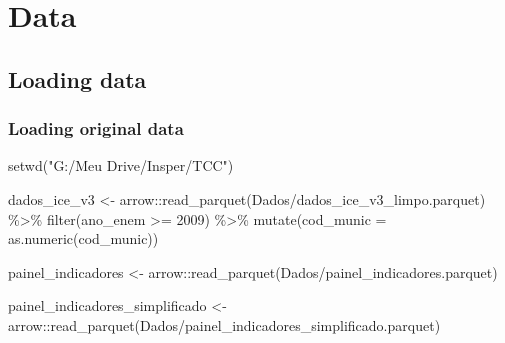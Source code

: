 \documentclass[
  letterpaper,
  DIV=11,
  numbers=noendperiod]{scrartcl}
\newenvironment{Shaded}{\begin{snugshade}}{\end{snugshade}}
\newcommand{\AttributeTok}[1]{\textcolor[rgb]{0.40,0.45,0.13}{#1}}
\newcommand{\DecValTok}[1]{\textcolor[rgb]{0.68,0.00,0.00}{#1}}
\newcommand{\FunctionTok}[1]{\textcolor[rgb]{0.28,0.35,0.67}{#1}}
\newcommand{\NormalTok}[1]{\textcolor[rgb]{0.00,0.23,0.31}{#1}}
\newcommand{\OtherTok}[1]{\textcolor[rgb]{0.00,0.23,0.31}{#1}}
\newcommand{\SpecialCharTok}[1]{\textcolor[rgb]{0.37,0.37,0.37}{#1}}
\newcommand{\StringTok}[1]{\textcolor[rgb]{0.13,0.47,0.30}{#1}}
\begin{document}
\section{Data}\label{data}

\subsection{Loading data}\label{loading-data}

\subsubsection{Loading original data}\label{loading-original-data}

\begin{Shaded}
\begin{Highlighting}[]
\FunctionTok{setwd}\NormalTok{(}\StringTok{"G:/Meu Drive/Insper/TCC"}\NormalTok{)}

\NormalTok{dados\_ice\_v3 }\OtherTok{\textless{}{-}}\NormalTok{ arrow}\SpecialCharTok{::}\FunctionTok{read\_parquet}\NormalTok{(}\StringTok{\textquotesingle{}Dados/dados\_ice\_v3\_limpo.parquet\textquotesingle{}}\NormalTok{) }\SpecialCharTok{\%\textgreater{}\%} 
  \FunctionTok{filter}\NormalTok{(ano\_enem }\SpecialCharTok{\textgreater{}=} \DecValTok{2009}\NormalTok{) }\SpecialCharTok{\%\textgreater{}\%} 
  \FunctionTok{mutate}\NormalTok{(}\AttributeTok{cod\_munic =} \FunctionTok{as.numeric}\NormalTok{(cod\_munic))}

\NormalTok{painel\_indicadores }\OtherTok{\textless{}{-}}\NormalTok{ arrow}\SpecialCharTok{::}\FunctionTok{read\_parquet}\NormalTok{(}\StringTok{\textquotesingle{}Dados/painel\_indicadores.parquet\textquotesingle{}}\NormalTok{)}

\NormalTok{painel\_indicadores\_simplificado }\OtherTok{\textless{}{-}}\NormalTok{ arrow}\SpecialCharTok{::}\FunctionTok{read\_parquet}\NormalTok{(}\StringTok{\textquotesingle{}Dados/painel\_indicadores\_simplificado.parquet\textquotesingle{}}\NormalTok{)}
\end{Highlighting}
\end{Shaded}
\end{document}
